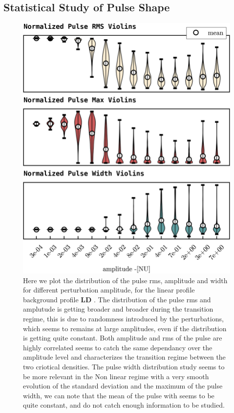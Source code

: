 \documentclass[11pt,a4paper,openany]{report}
\begin{document}
\begin{multicols}{2}
    \subsection{Statistical Study of Pulse Shape}




    \begin{figure}[H]
        \centering
        \includegraphics[width=1\linewidth]{./figures/pulse_overview.png}
        \caption{Here we plot the distribution of the pulse rms, amplitude and width for different perturbation amplitude, for the linear profile background profile \textbf{LD} . The distribution of the pulse rms  and amplutude is getting broader and broader during the transition regime, this is due to randomness introduced by the perturbations, which seems to remains at large amplitudes, even if the distribution is getting quite constant. Both amplitude and rms of the pulse are highly correlated seems to catch the same dependancy over the amplitude level and characterizes the transition regime between the two criotical densities. The pulse width distribution study seems to be more relevant in the Non linear regime with a very smooth evolution of the standard deviation and the maximum of the pulse width, we can note that the mean of the pulse with seems to be quite constant, and do not catch enough information to be studied.}
        \label{fig:barrier}
    \end{figure}


\end{multicols}
\end{document}
